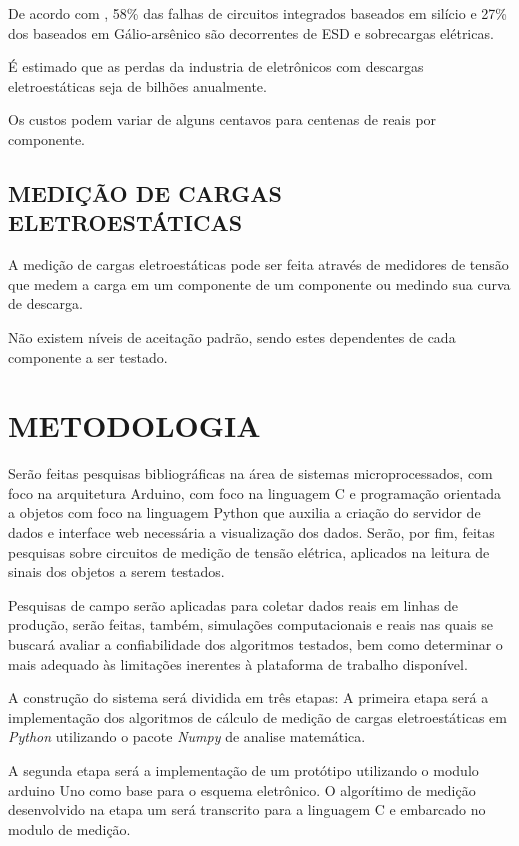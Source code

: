 \documentclass[
	12pt,				%
	openright,			%
	oneside,			%
	a4paper,			%
	chapter=TITLE,		%
	english,			%
	french,				%
	spanish,			%
	brazil,				%
	article,			%
	]{uea-abntex2}
\begin{document}
De acordo com \citeauthor{Hwang2005}, 58\% das falhas de circuitos integrados baseados em silício e 27\% dos baseados em Gálio-arsênico são decorrentes de ESD e sobrecargas elétricas.

É estimado que as perdas da industria de eletrônicos com descargas eletroestáticas seja de bilhões anualmente. \cite{Hwang2005}

Os custos podem variar de alguns centavos para centenas de reais por componente.

\subsection{MEDIÇÃO DE CARGAS ELETROESTÁTICAS}
A medição de cargas eletroestáticas pode ser feita através de medidores de tensão que medem a carga em um componente de um componente ou medindo sua curva de descarga.\cite{Berndt2010}

Não existem níveis de aceitação padrão, sendo estes dependentes de cada componente a ser testado.  
\section{METODOLOGIA}

\hspace*{0.8cm}Serão feitas pesquisas bibliográficas na área de sistemas microprocessados, com foco na arquitetura Arduino, com foco na linguagem C e programação orientada a objetos com foco na linguagem Python\cite{python} que auxilia a criação do servidor de dados e interface web necessária a visualização dos dados. Serão, por fim, feitas pesquisas sobre circuitos de medição de tensão elétrica, aplicados na leitura de sinais dos objetos a serem testados.

Pesquisas de campo serão aplicadas para coletar dados reais em linhas de produção, serão feitas, também, simulações computacionais e reais nas quais se buscará avaliar a confiabilidade dos algoritmos testados, bem como determinar o mais adequado às limitações inerentes à plataforma de trabalho disponível.

A construção do sistema será dividida em três etapas: A primeira etapa será a implementação dos algoritmos de cálculo de medição de cargas eletroestáticas em \textit{Python} utilizando o pacote \textit{Numpy} de analise matemática.\cite{numpy}

A segunda etapa será a implementação de um protótipo utilizando o modulo arduino Uno como base para o esquema eletrônico. O algorítimo de medição desenvolvido na etapa um será transcrito para a linguagem C e embarcado no modulo de medição.  \cite{arduino}
\end{document}
